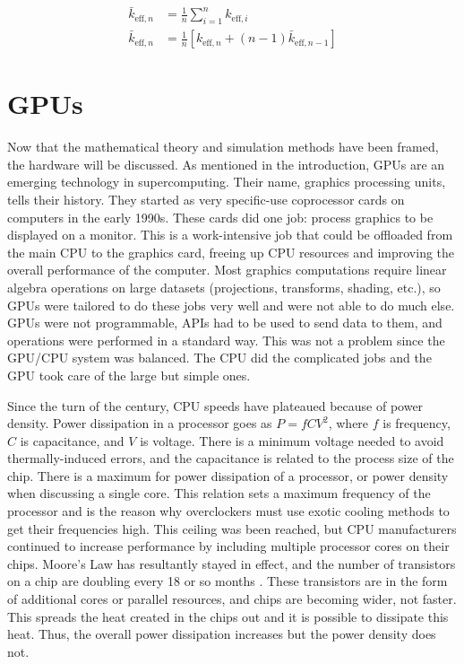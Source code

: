 \begin{equation}
\label{k_eff_final}
\begin{split}
\bar{k}_{\mathrm{eff},n} &= \frac{1}{n} \sum_{i=1}^{n} k_{\mathrm{eff},i} \\
\bar{k}_{\mathrm{eff},n} &= \frac{1}{n} \left[ k_{\mathrm{eff},n} + (n-1) \bar{k}_{\mathrm{eff},n-1}  \right]
\end{split}
\end{equation}



\section{GPUs}

Now that the mathematical theory and simulation methods have been framed, the hardware will be discussed.  As mentioned in the introduction, GPUs are an emerging technology in supercomputing.  Their name, graphics processing units, tells their history.  They started as very specific-use coprocessor cards on computers in the early 1990s.  These cards did one job:  process graphics to be displayed on a monitor. This is a work-intensive job that could be offloaded from the main CPU to the graphics card, freeing up CPU resources and improving the overall performance of the computer.  Most graphics computations require linear algebra operations on large datasets (projections, transforms, shading, etc.), so GPUs were tailored to do these jobs very well and were not able to do much else.  GPUs were not programmable, APIs had to be used to send data to them, and operations were performed in a standard way. %
  This was not a problem since the GPU/CPU system was balanced.  The CPU did the complicated jobs and the GPU took care of the large but simple ones.  
  
Since the turn of the century, CPU speeds have plateaued because of power density.  Power dissipation in a processor goes as $P=fCV^2$, where $f$ is frequency, $C$ is capacitance, and $V$ is voltage.  There is a minimum voltage needed to avoid thermally-induced errors, and the capacitance is related to the process size of the chip.  There is a maximum for power dissipation of a processor, or power density when discussing a single core. %
  This relation sets a maximum frequency of the processor and is the reason why overclockers must use exotic cooling methods to get their frequencies high.  This ceiling was been reached, but CPU manufacturers continued to increase performance by including multiple processor cores on their chips.  Moore's Law has resultantly stayed in effect, and the number of transistors on a chip are doubling every 18 or so months \cite{moore}.  
 These transistors are in the form of additional cores or parallel resources, and chips are becoming wider, not faster.  This spreads the heat created in the chips out and it is possible to dissipate this heat. Thus, the overall power dissipation increases but the power density does not.  

